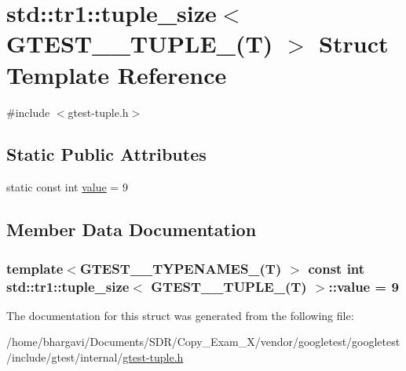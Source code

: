 \hypertarget{structstd_1_1tr1_1_1tuple__size_3_01_g_t_e_s_t__9___t_u_p_l_e___07_t_08_01_4}{}\section{std\+:\+:tr1\+:\+:tuple\+\_\+size$<$ G\+T\+E\+S\+T\+\_\+\_\+\+T\+U\+P\+L\+E\+\_\+(T) $>$ Struct Template Reference}
\label{structstd_1_1tr1_1_1tuple__size_3_01_g_t_e_s_t__9___t_u_p_l_e___07_t_08_01_4}


{\ttfamily \#include $<$gtest-\/tuple.\+h$>$}

\subsection*{Static Public Attributes}
\begin{DoxyCompactItemize}
\item 
static const int \hyperlink{structstd_1_1tr1_1_1tuple__size_3_01_g_t_e_s_t__9___t_u_p_l_e___07_t_08_01_4_aea347b00f3a9643d02e322d5cc6648e4}{value} = 9
\end{DoxyCompactItemize}


\subsection{Member Data Documentation}
\subsubsection[{\texorpdfstring{value}{value}}]{\setlength{\rightskip}{0pt plus 5cm}template$<$G\+T\+E\+S\+T\+\_\+\_\+\+T\+Y\+P\+E\+N\+A\+M\+E\+S\+\_\+(\+T) $>$ const int {\bf std\+::tr1\+::tuple\+\_\+size}$<$ {\bf G\+T\+E\+S\+T\+\_\+\_\+\+T\+U\+P\+L\+E\+\_\+}(T) $>$\+::value = 9\hspace{0.3cm}{\ttfamily [static]}}\hypertarget{structstd_1_1tr1_1_1tuple__size_3_01_g_t_e_s_t__9___t_u_p_l_e___07_t_08_01_4_aea347b00f3a9643d02e322d5cc6648e4}{}\label{structstd_1_1tr1_1_1tuple__size_3_01_g_t_e_s_t__9___t_u_p_l_e___07_t_08_01_4_aea347b00f3a9643d02e322d5cc6648e4}


The documentation for this struct was generated from the following file\+:\begin{DoxyCompactItemize}
\item 
/home/bhargavi/\+Documents/\+S\+D\+R/\+Copy\+\_\+\+Exam\+\_\+X/vendor/googletest/googletest/include/gtest/internal/\hyperlink{gtest-tuple_8h}{gtest-\/tuple.\+h}\end{DoxyCompactItemize}
